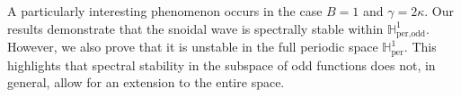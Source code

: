 \documentclass[10pt,reqno,a4paper]{amsart} %
\theoremstyle{definition} %
\numberwithin{equation}{section}
\numberwithin{figure}{section}
\begin{document}
A particularly interesting phenomenon occurs in the case $B = 1$ and $\gamma = 2\kappa$. Our results demonstrate that the snoidal wave is spectrally stable within $\mathbb{H}^1_{\text{per,odd}}$. However, we also prove that it is unstable in the full periodic space $\mathbb{H}^1_{\text{per}}$. This highlights that spectral stability in the subspace of odd functions does not, in general, allow for an extension to the entire space.

\vspace{0.5cm}

\end{document}
